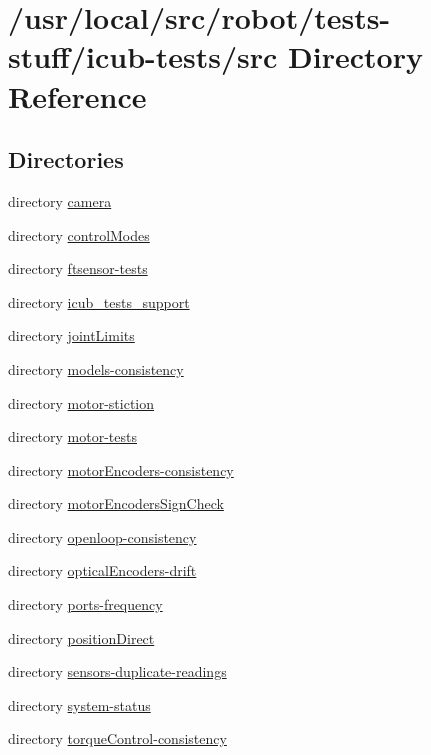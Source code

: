 \section{/usr/local/src/robot/tests-\/stuff/icub-\/tests/src Directory Reference}
\label{dir_13d06e6b8110c901da6dbc76e80abdfa}
\subsection*{Directories}
\begin{DoxyCompactItemize}
\item 
directory \hyperlink{dir_066d661332cb63d818aab860f4a82024}{camera}
\item 
directory \hyperlink{dir_2fc795b9de975a435a3718beb82cd1ff}{control\-Modes}
\item 
directory \hyperlink{dir_ae814844969255f68c24a1227446d595}{ftsensor-\/tests}
\item 
directory \hyperlink{dir_2601342d55c4c5e30d8e324d15d5a992}{icub\-\_\-tests\-\_\-support}
\item 
directory \hyperlink{dir_aa24f5f4cb7032c525c0aa59975659d0}{joint\-Limits}
\item 
directory \hyperlink{dir_eccedb847b528abd5832dfd514dc2cd6}{models-\/consistency}
\item 
directory \hyperlink{dir_90eef672f96e9a8f6601ae4c3a253df9}{motor-\/stiction}
\item 
directory \hyperlink{dir_e23a3429dde0fe0b23d0688ab6fbcab5}{motor-\/tests}
\item 
directory \hyperlink{dir_17d4ce36b7900267f65be626f70cb756}{motor\-Encoders-\/consistency}
\item 
directory \hyperlink{dir_381e91bea29aa132c7ddaeecf0705ee9}{motor\-Encoders\-Sign\-Check}
\item 
directory \hyperlink{dir_4d564794f5e6690d32405517a9a9695e}{openloop-\/consistency}
\item 
directory \hyperlink{dir_6292a1d34f76cbbc5d1c993d8b5a10cd}{optical\-Encoders-\/drift}
\item 
directory \hyperlink{dir_f2915d824dbcc9cd56b46b61c487d65c}{ports-\/frequency}
\item 
directory \hyperlink{dir_7d20153170d6a23365d8da545dc709f1}{position\-Direct}
\item 
directory \hyperlink{dir_918ed0f7f9dbf9a09b3b401b6b49f7b8}{sensors-\/duplicate-\/readings}
\item 
directory \hyperlink{dir_0cd6c076357e074f55f9c4922f92a746}{system-\/status}
\item 
directory \hyperlink{dir_bdcb24c47bb1acc4d18ac37bcdabe4da}{torque\-Control-\/consistency}
\end{DoxyCompactItemize}
